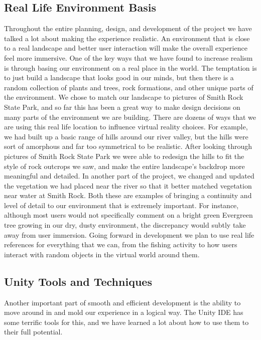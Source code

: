 \documentclass[10pt,journal,compsoc,onecolumn, draftclsnofoot]{IEEEtran}
\begin{document}
\subsection{Real Life Environment Basis}
Throughout the entire planning, design, and development of the project we have talked a lot about making the experience realistic.
An environment that is close to a real landscape and better user interaction will make the overall experience feel more immersive.
One of the key ways that we have found to increase realism is through basing our environment on a real place in the world.
The temptation is to just build a landscape that looks good in our minds, but then there is a random collection of plants and trees, rock formations, and other unique parts of the environment.
We chose to match our landscape to pictures of Smith Rock State Park, and so far this has been a great way to make design decisions on many parts of the environment we are building.
There are dozens of ways that we are using this real life location to influence virtual reality choices.
For example, we had built up a basic range of hills around our river valley, but the hills were sort of amorphous and far too symmetrical to be realistic.
After looking through pictures of Smith Rock State Park we were able to redesign the hills to fit the style of rock outcrops we saw, and make the entire landscape's backdrop more meaningful and detailed.
In another part of the project, we changed and updated the vegetation we had placed near the river so that it better matched vegetation near water at Smith Rock.
Both these are examples of bringing a continuity and level of detail to our environment that is extremely important.
For instance, although most users would not specifically comment on a bright green Evergreen tree growing in our dry, dusty environment, the discrepancy would subtly take away from user immersion.
Going forward in development we plan to use real life references for everything that we can, from the fishing activity to how users interact with random objects in the virtual world around them.

\subsection{Unity Tools and Techniques}
Another important part of smooth and efficient development is the ability to move around in and mold our experience in a logical way.
The Unity IDE has some terrific tools for this, and we have learned a lot about how to use them to their full potential.
\end{document}
